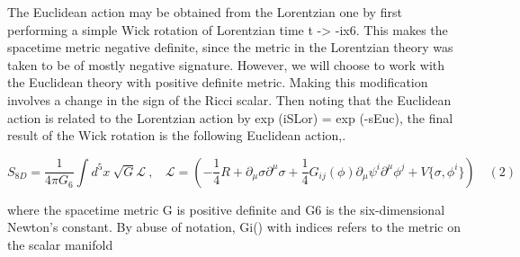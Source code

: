 \documentclass{article}
\begin{document}
The Euclidean action may be obtained from the Lorentzian one by first performing a simple
Wick rotation of Lorentzian time t -> -ix6. This makes the spacetime metric negative definite, since the metric in the Lorentzian theory was taken to be of mostly negative signature.
However, we will choose to work with the Euclidean theory with positive definite metric.
Making this modification involves a change in the sign of the Ricci scalar. Then noting that
the Euclidean action is related to the Lorentzian action by exp (iSLor) = exp (-sEuc), the
final result of the Wick rotation is the following Euclidean action,.


\begin{equation}
S _ { 8 D } = \frac { 1 } { 4 \pi G _ { 6 } } \int d ^ { 5 } x ~ \sqrt { G } \mathcal { L } ~, ~ ~ ~ ~ \mathcal { L } = \left ( - \frac { 1 } { 4 } R + \partial _ { \mu } \sigma \partial ^ { \mu } \sigma + \frac { 1 } { 4 } G _ { i j } ( \phi ) \partial _ { \mu } \psi ^ { i } \partial ^ { \mu } \phi ^ { j } + V \{ \sigma, \phi ^ { i } \} \right ) \quad ( 2 )
\end{equation}


where the spacetime metric G is positive definite and G6 is the six-dimensional Newton's
constant. By abuse of notation, Gi() with indices refers to the metric on the scalar manifold
\end{document}
